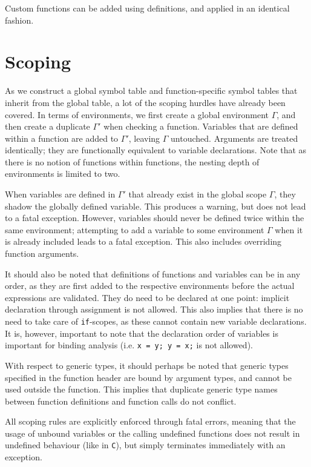 \documentclass[a4paper]{article}
\begin{document}
Custom functions can be added using definitions, and applied in an identical fashion.

\section{Scoping}

As we construct a global symbol table and function-specific symbol tables that inherit from the global table, a lot of the scoping hurdles have already been covered. In terms of environments, we first create a global environment $\Gamma$, and then create a duplicate $\Gamma'$ when checking a function. Variables that are defined within a function are added to $\Gamma'$, leaving $\Gamma$ untouched. Arguments are treated identically; they are functionally equivalent to variable declarations. Note that as there is no notion of functions within functions, the nesting depth of environments is limited to two.

When variables are defined in $\Gamma'$ that already exist in the global scope $\Gamma$, they shadow the globally defined variable. This produces a warning, but does not lead to a fatal exception. However, variables should never be defined twice within the same environment; attempting to add a variable to some environment $\Gamma$ when it is already included leads to a fatal exception. This also includes overriding function arguments.

It should also be noted that definitions of functions and variables can be in any order, as they are first added to the respective environments before the actual expressions are validated. They do need to be declared at one point: implicit declaration through assignment is not allowed. This also implies that there is no need to take care of {\tt if}-scopes, as these cannot contain new variable declarations. It is, however, important to note that the declaration order of variables is important for binding analysis (i.e. {\tt x = y; y = x;} is not allowed).

With respect to generic types, it should perhaps be noted that generic types specified in the function header are bound by argument types, and cannot be used outside the function. This implies that duplicate generic type names between function definitions and function calls do not conflict.

All scoping rules are explicitly enforced through fatal errors, meaning that the usage of unbound variables or the calling undefined functions does not result in undefined behaviour (like in {\tt C}), but simply terminates immediately with an exception.
\end{document}
